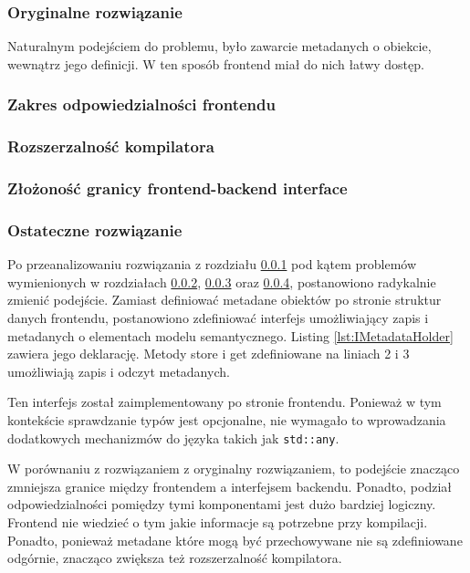 \subsubsection{Oryginalne rozwiązanie}\label{original_solution}

Naturalnym podejściem do problemu, było zawarcie metadanych o obiekcie, wewnątrz jego definicji.
W ten sposób frontend miał do nich łatwy dostęp.

\subsubsection{Zakres odpowiedzialności frontendu} \label{frontend_responsibility}

\subsubsection{Rozszerzalność kompilatora}\label{compiler_extensibility}

\subsubsection{Złożoność granicy frontend-backend interface} \label{frontend_backend_complexity}

\subsubsection{Ostateczne rozwiązanie}\label{final_solution}
Po przeanalizowaniu rozwiązania z rozdziału \ref{original_solution} pod kątem problemów wymienionych w rozdziałach \ref{frontend_responsibility}, \ref{compiler_extensibility} oraz \ref{frontend_backend_complexity}, postanowiono radykalnie zmienić podejście.
Zamiast definiować metadane obiektów po stronie struktur danych frontendu, postanowiono zdefiniować interfejs umożliwiający zapis i metadanych o elementach modelu semantycznego. 
Listing \ref{lst:IMetadataHolder} zawiera jego deklarację.
Metody store i get zdefiniowane na liniach 2 i 3 umożliwiają zapis i odczyt metadanych.

Ten interfejs został zaimplementowany po stronie frontendu.
Ponieważ w tym kontekście sprawdzanie typów jest opcjonalne, nie wymagało to wprowadzania dodatkowych mechanizmów do języka takich jak \texttt{std::any}.

W porównaniu z rozwiązaniem z oryginalny rozwiązaniem, to podejście znacząco zmniejsza granice między frontendem a interfejsem backendu.
Ponadto, podział odpowiedzialności pomiędzy tymi komponentami jest dużo bardziej logiczny.
Frontend nie wiedzieć o tym jakie informacje są potrzebne przy kompilacji.
Ponadto, ponieważ metadane które mogą być przechowywane nie są zdefiniowane odgórnie, znacząco zwiększa też rozszerzalność kompilatora.


